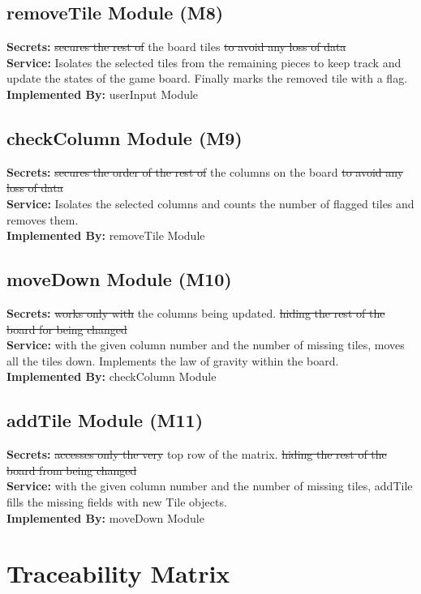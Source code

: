 \documentclass[12pt]{article}
\begin{document}
\subsection{removeTile Module (M8)}
\textbf{Secrets:} \st{secures the rest of} the board tiles \st{to avoid any loss of data}\\
\textbf{Service:} Isolates the selected tiles from the remaining pieces to keep track and update the states of the game board. Finally marks the removed tile with a flag.\\
\textbf{Implemented By:} userInput Module

\subsection{checkColumn Module (M9)}
\textbf{Secrets:} \st{secures the order of the rest of} the columns on the board \st{to avoid any loss of data}\\
\textbf{Service:} Isolates the selected columns and counts the number of flagged tiles and removes them.\\
\textbf{Implemented By:} removeTile Module

\subsection{moveDown Module (M10)}
\textbf{Secrets:} \st{works only with} the columns being updated. \st{hiding the rest of the board for being changed}\\
\textbf{Service:} with the given column number and the number of missing tiles, moves all the tiles down. Implements the law of gravity within the board.\\
\textbf{Implemented By:} checkColumn Module

\subsection{addTile Module (M11)}
\textbf{Secrets:} \st{accesses only the very} top row of the matrix. \st{hiding the rest of the board from being changed}\\
\textbf{Service:} with the given column number and the number of missing tiles, addTile fills the missing fields with new Tile objects.\\
\textbf{Implemented By:} moveDown Module

\section{Traceability Matrix} \label{SecTM}
\end{document}
